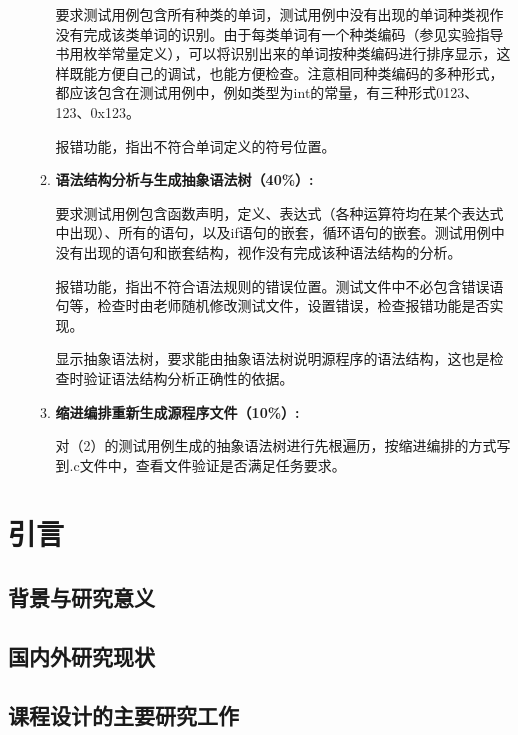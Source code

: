 \documentclass{ctexrep}
\begin{document}
\begin{enumerate}
\begin{enumerate}[label={(\arabic*)}]
        要求测试用例包含所有种类的单词，测试用例中没有出现的单词种类视作没有完成该类单词的识别。由于每类单词有一个种类编码（参见实验指导书用枚举常量定义），可以将识别出来的单词按种类编码进行排序显示，这样既能方便自己的调试，也能方便检查。注意相同种类编码的多种形式，都应该包含在测试用例中，例如类型为int的常量，有三种形式0123、123、0x123。
        
        报错功能，指出不符合单词定义的符号位置。

        \item \textbf{语法结构分析与生成抽象语法树（40\%）:}
        
        要求测试用例包含函数声明，定义、表达式（各种运算符均在某个表达式中出现）、所有的语句，以及if语句的嵌套，循环语句的嵌套。测试用例中没有出现的语句和嵌套结构，视作没有完成该种语法结构的分析。
        
        报错功能，指出不符合语法规则的错误位置。测试文件中不必包含错误语句等，检查时由老师随机修改测试文件，设置错误，检查报错功能是否实现。

        显示抽象语法树，要求能由抽象语法树说明源程序的语法结构，这也是检查时验证语法结构分析正确性的依据。
        \item \textbf{缩进编排重新生成源程序文件（10\%）:}
        
        对（2）的测试用例生成的抽象语法树进行先根遍历，按缩进编排的方式写到.c文件中，查看文件验证是否满足任务要求。

    \end{enumerate}

\end{enumerate}






    


\tableofcontents


\chapter{引言}
\section{背景与研究意义}

\section{国内外研究现状}
\section{课程设计的主要研究工作}
\end{document}
